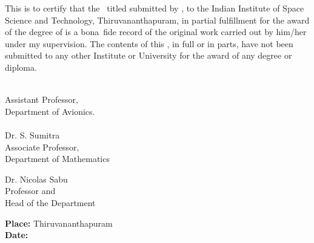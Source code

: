 This is to certify that the \Doctype\ titled \textbf{\textit{\Title}}
submitted by {\bf\Author}, to the Indian Institute of Space Science and
Technology, Thiruvananthapuram, in partial fulfillment for the award of the
degree of {\bf\Degreetext} is a bona~fide record of the original work carried
out by him/her under my supervision. The contents of this \Doctype, in full or
in parts, have not been submitted to any other Institute or University for
the award of any degree or diploma.

\vspace{35mm}
\noindent
\begin{minipage}{0.5\textwidth}
\Advisor\\
Assistant Professor,\\
Department of Avionics.\\
\\Dr. S. Sumitra\\
Associate Professor,\\
Department of Mathematics
\end{minipage}
\hspace{2cm}
\begin{minipage}{0.5\textwidth}
Dr. Nicolas Sabu\\
Professor and\\ Head of the Department
\end{minipage}

\vspace{30mm}
\noindent
\textbf{Place: }Thiruvananthapuram\\
\textbf{Date: \ }\Date


